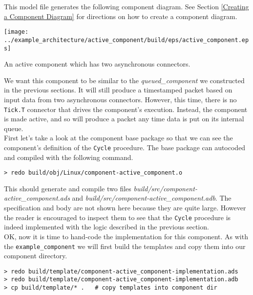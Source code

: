 This model file generates the following component diagram. See Section \ref{Creating a Component Diagram} for directions on how to create a component diagram.

\vspace{5mm} %
\texttt{[image: ../example\_architecture/active\_component/build/eps/active\_component.eps]}
\caption{An active component which has two asynchronous connectors.}
\vspace{5mm} %

We want this component to be similar to the \textit{queued\_component} we constructed in the previous sections. It will still produce a timestamped packet based on input data from two asynchronous connectors. However, this time, there is no \texttt{Tick.T} connector that drives the component's execution. Instead, the component is made active, and so will produce a packet any time data is put on its internal queue. \\

First let's take a look at the component base package so that we can see the component's definition of the \texttt{Cycle} procedure. The base package can autocoded and compiled with the following command.

\vspace{5mm} %
\begin{verbatim}
> redo build/obj/Linux/component-active_component.o
\end{verbatim}
\vspace{5mm} %

This should generate and compile two files \textit{build/src/component-active\_component.ads} and \textit{build/src/component-active\_component.adb}. The specification and body are not shown here because they are quite large. However the reader is encouraged to inspect them to see that the \texttt{Cycle} procedure is indeed implemented with the logic described in the previous section. \\

OK, now it is time to hand-code the implementation for this component. As with the \texttt{example\_component} we will first build the templates and copy them into our component directory.

\vspace{5mm} %
\begin{verbatim}
> redo build/template/component-active_component-implementation.ads 
> redo build/template/component-active_component-implementation.adb 
> cp build/template/* .   # copy templates into component dir
\end{verbatim}
\vspace{5mm} %

